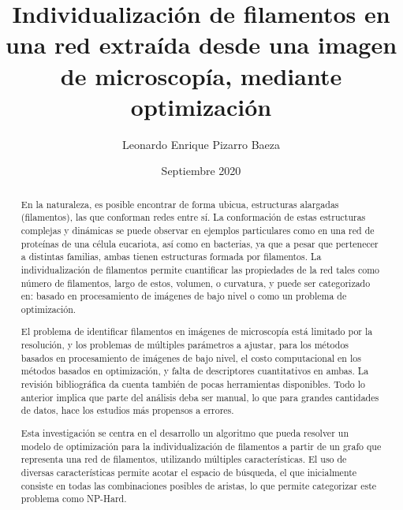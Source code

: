 \documentclass[upright, contnum]{umemoria}
\author{Leonardo Enrique Pizarro Baeza}
\title{Individualizaci\'on de filamentos en una red extra\'ida desde una imagen de microscop\'ia, mediante optimizaci\'on}
\date{Septiembre 2020}
\begin{document}
\newcommand{\citepxl}[2][]{(#1\unskip \citet{#2})}

\frontmatter
\maketitle

\begin{abstract}
En la naturaleza, es posible encontrar de forma ubicua, estructuras alargadas (filamentos), las que conforman redes entre s\'i.  La conformaci\'on de estas estructuras complejas y din\'amicas se puede observar en ejemplos
particulares como en una red de prote\'inas de una c\'elula eucariota, as\'i como en bacterias, ya que a pesar que pertenecer a distintas familias, ambas tienen estructuras formada por filamentos. La individualizaci\'on de filamentos permite cuantificar las propiedades de la red tales como n\'umero de filamentos, largo de estos, volumen, o curvatura, y  puede ser categorizado en: basado en procesamiento de im\'agenes de bajo nivel o como un problema de optimizaci\'on.

El problema de identificar filamentos en im\'agenes de microscop\'ia est\'a limitado por la resoluci\'on, y los problemas de m\'ultiples par\'ametros a ajustar, para los m\'etodos basados en procesamiento de im\'agenes de bajo nivel, el costo
computacional en los m\'etodos basados en optimizaci\'on, y falta de descriptores cuantitativos en ambas. La revisi\'on bibliogr\'afica da cuenta tambi\'en de pocas herramientas disponibles. Todo lo anterior implica que parte del an\'alisis deba ser manual, lo que para grandes cantidades de datos, hace los estudios más propensos a errores.

Esta investigación se centra en el desarrollo un algoritmo que pueda resolver un modelo de optimizaci\'on para la individualizaci\'on de filamentos a partir de un grafo que representa una red de filamentos, utilizando m\'ultiples caracter\'isticas. El uso de diversas caracter\'isticas permite acotar el espacio de b\'usqueda, el que inicialmente consiste en todas las combinaciones posibles de aristas, lo que permite categorizar este problema como NP-Hard.




\end{abstract}
\end{document}
